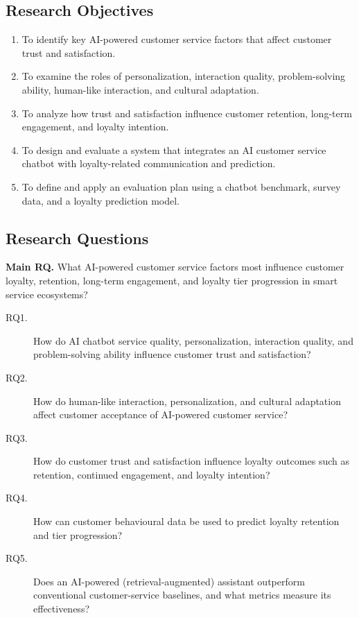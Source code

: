 \documentclass[runningheads]{llncs}
\begin{document}
\subsection{Research Objectives}

\begin{enumerate}
\item To identify key AI-powered customer service factors that affect customer trust and satisfaction.
\item To examine the roles of personalization, interaction quality, problem-solving ability, human-like interaction, and cultural adaptation.
\item To analyze how trust and satisfaction influence customer retention, long-term engagement, and loyalty intention.
\item To design and evaluate a system that integrates an AI customer service chatbot with loyalty-related communication and prediction.
\item To define and apply an evaluation plan using a chatbot benchmark, survey data, and a loyalty prediction model.
\end{enumerate}

\subsection{Research Questions}

\noindent\textbf{Main RQ.} What AI-powered customer service factors most influence customer loyalty, retention, long-term engagement, and loyalty tier progression in smart service ecosystems?

\begin{description}
\item[RQ1.] How do AI chatbot service quality, personalization, interaction quality, and problem-solving ability influence customer trust and satisfaction?
\item[RQ2.] How do human-like interaction, personalization, and cultural adaptation affect customer acceptance of AI-powered customer service?
\item[RQ3.] How do customer trust and satisfaction influence loyalty outcomes such as retention, continued engagement, and loyalty intention?
\item[RQ4.] How can customer behavioural data be used to predict loyalty retention and tier progression?
\item[RQ5.] Does an AI-powered (retrieval-augmented) assistant outperform conventional customer-service baselines, and what metrics measure its effectiveness?
\end{description}
\end{document}
